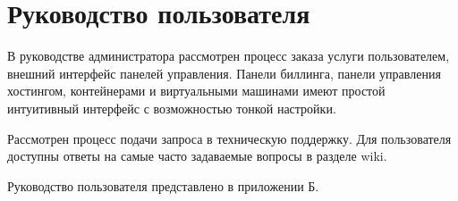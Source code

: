 \section{Руководство пользователя}

В руководстве администратора рассмотрен процесс заказа услуги пользователем, внешний интерфейс панелей управления.
Панели биллинга, панели управления хостингом, контейнерами и виртуальными машинами имеют простой интуитивный интерфейс с возможностью тонкой настройки.

Рассмотрен процесс подачи запроса в техническую поддержку.
Для пользователя доступны ответы на самые часто задаваемые вопросы в разделе wiki.

Руководство пользователя представлено в приложении Б.

\clearpage
